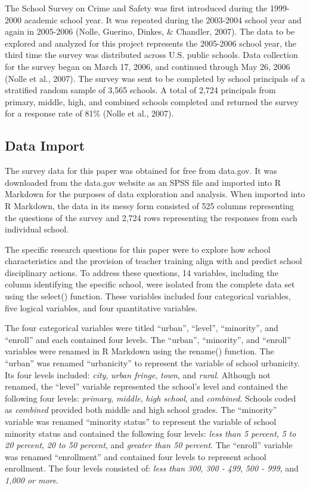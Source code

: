 \documentclass[man]{apa6}
\begin{document}
The School Survey on Crime and Safety was first introduced during the 1999-2000 academic school year. It was repeated during the 2003-2004 school year and again in 2005-2006 (Nolle, Guerino, Dinkes, \& Chandler, 2007). The data to be explored and analyzed for this project represents the 2005-2006 school year, the third time the survey was distributed across U.S. public schools. Data collection for the survey began on March 17, 2006, and continued through May 26, 2006 (Nolle et al., 2007). The survey was sent to be completed by school principals of a stratified random sample of 3,565 schools. A total of 2,724 principals from primary, middle, high, and combined schools completed and returned the survey for a response rate of 81\% (Nolle et al., 2007).

\hypertarget{data-import}{%
\subsection{Data Import}\label{data-import}}

The survey data for this paper was obtained for free from data.gov. It was downloaded from the data.gov website as an SPSS file and imported into R Markdown for the purposes of data exploration and analysis. When imported into R Markdown, the data in its messy form consisted of 525 columns representing the questions of the survey and 2,724 rows representing the responses from each individual school.

The specific research questions for this paper were to explore how school characteristics and the provision of teacher training align with and predict school disciplinary actions. To address these questions, 14 variables, including the column identifying the specific school, were isolated from the complete data set using the select() function. These variables included four categorical variables, five logical variables, and four quantitative variables.

The four categorical variables were titled \enquote{urban}, \enquote{level}, \enquote{minority}, and \enquote{enroll} and each contained four levels. The \enquote{urban}, \enquote{minority}, and \enquote{enroll} variables were renamed in R Markdown using the rename() function. The \enquote{urban} was renamed \enquote{urbanicity} to represent the variable of school urbanicity. Its four levels included: \emph{city}, \emph{urban fringe}, \emph{town}, and \emph{rural}. Although not renamed, the \enquote{level} variable represented the school's level and contained the following four levels: \emph{primary}, \emph{middle}, \emph{high school}, and \emph{combined}. Schools coded as \emph{combined} provided both middle and high school grades. The \enquote{minority} variable was renamed \enquote{minority status} to represent the variable of school minority status and contained the following four levels: \emph{less than 5 percent}, \emph{5 to 20 percent}, \emph{20 to 50 percent}, and \emph{greater than 50 percent}. The \enquote{enroll} variable was renamed \enquote{enrollment} and contained four levels to represent school enrollment. The four levels consisted of: \emph{less than 300}, \emph{300 - 499}, \emph{500 - 999}, and \emph{1,000 or more}.
\end{document}
